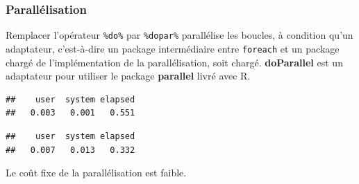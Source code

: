 \documentclass[
  12pt,
  french,
  a4paper,
  extrafontsizes,onecolumn,openright
  ]{memoir}
\newenvironment{Shaded}{\begin{snugshade}}{\end{snugshade}}
\newcommand{\CommentTok}[1]{\textcolor[rgb]{0.56,0.35,0.01}{\textit{#1}}}
\newcommand{\DataTypeTok}[1]{\textcolor[rgb]{0.13,0.29,0.53}{#1}}
\newcommand{\KeywordTok}[1]{\textcolor[rgb]{0.13,0.29,0.53}{\textbf{#1}}}
\newcommand{\NormalTok}[1]{#1}
\newcommand{\OperatorTok}[1]{\textcolor[rgb]{0.81,0.36,0.00}{\textbf{#1}}}
\newcommand{\StringTok}[1]{\textcolor[rgb]{0.31,0.60,0.02}{#1}}
\begin{document}
\hypertarget{paralluxe9lisation}{%
\subsubsection{Parallélisation}\label{paralluxe9lisation}}

Remplacer l'opérateur \texttt{\%do\%} par \texttt{\%dopar\%} parallélise les boucles, à condition qu'un adaptateur, c'est-à-dire un package intermédiaire entre \texttt{foreach} et un package chargé de l'implémentation de la parallélisation, soit chargé.
\textbf{doParallel} est un adaptateur pour utiliser le package \textbf{parallel} livré avec R.

\scriptsize

\begin{Shaded}
\end{Shaded}

\begin{verbatim}
##    user  system elapsed 
##   0.003   0.001   0.551
\end{verbatim}

\begin{Shaded}
\end{Shaded}

\begin{verbatim}
##    user  system elapsed 
##   0.007   0.013   0.332
\end{verbatim}

\normalsize

Le coût fixe de la parallélisation est faible.
\end{document}
